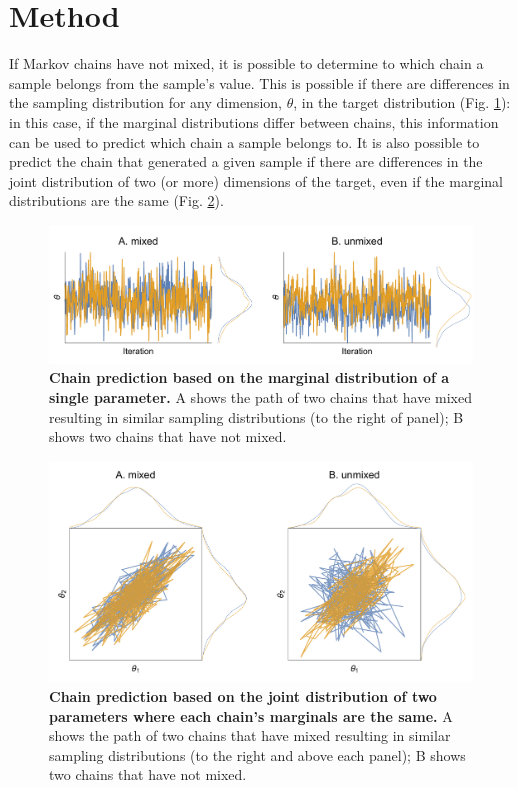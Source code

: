 \documentclass{article}
\begin{document}
\section{Method}\label{sec:method}
If Markov chains have not mixed, it is possible to determine to which chain a sample belongs from the sample's value. This is possible if there are differences in the sampling distribution for any dimension, $\theta$, in the target distribution (Fig. \ref{fig:marginal}): in this case, if the marginal distributions differ between chains, this information can be used to predict which chain a sample belongs to. It  is also possible to predict the chain that generated a given sample if there are differences in the joint distribution of two (or more) dimensions of the target, even if the marginal distributions are the same (Fig. \ref{fig:joint}).

\begin{figure}[h]
	\centerline{\includegraphics[width=1.0\textwidth]{../output/unmixed_1.pdf}}
	\caption{\textbf{Chain prediction based on the marginal distribution of a single parameter.} A shows the path of two chains that have mixed resulting in similar sampling distributions (to the right of panel); B shows two chains that have not mixed.}
	\label{fig:marginal}
\end{figure}

\begin{figure}[h]
	\centerline{\includegraphics[width=1.0\textwidth]{../output/unmixed_2.pdf}}
	\caption{\textbf{Chain prediction based on the joint distribution of two parameters where each chain's marginals are the same.} A shows the path of two chains that have mixed resulting in similar sampling distributions (to the right and above each panel); B shows two chains that have not mixed.}
	\label{fig:joint}
\end{figure}
\end{document}
